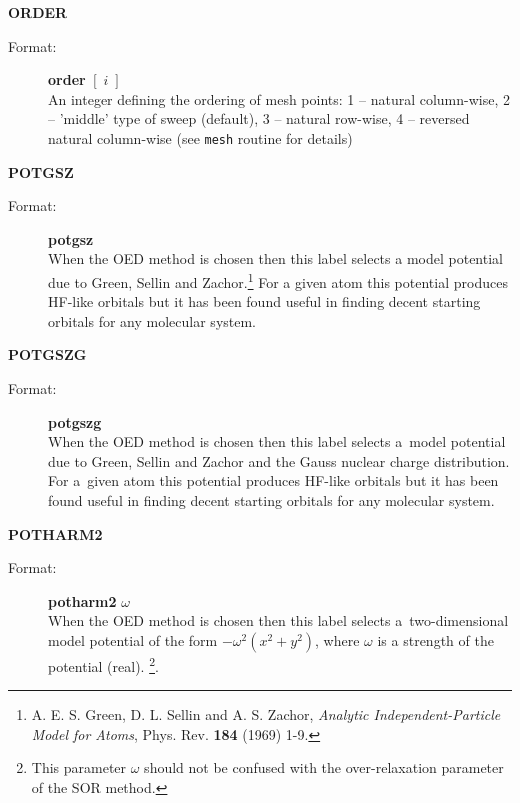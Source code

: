 \documentclass[12pt,a4paper]{article}
\newcommand{\ft}[1]{\texttt{#1}}
\begin{document}
\begin{description}
\item \textbf{ORDER}
\begin{description}
\item[Format:] \textbf{order} $[\;i\;]$\\ An integer defining the ordering of mesh points:
  1 -- natural column-wise, 2 -- 'middle' type of sweep (default), 3 -- natural
  row-wise, 4 -- reversed natural column-wise (see \ft{mesh} routine for details)
\end{description}



\item \textbf{POTGSZ}
\begin{description}
\item[Format:] \textbf{potgsz} \\ When the OED method is chosen then
  this label selects a model potential due to Green, Sellin and
  Zachor.\footnote{A. E. S. Green, D. L. Sellin and A. S. Zachor,
    \textsl{Analytic Independent-Particle Model for Atoms},
    Phys. Rev. \textbf{184} (1969) 1-9. }
  For a given atom this potential produces HF-like orbitals but it has
  been found useful in finding decent starting orbitals for any
  molecular system.
\end{description}


\item \textbf{POTGSZG}
\begin{description}
\item[Format:] \textbf{potgszg} \\ When the OED method is chosen then
  this label selects a~model potential due to Green, Sellin and Zachor
  and the Gauss nuclear charge distribution. For a~given atom this
  potential produces HF-like orbitals but it has been found useful in
  finding decent starting orbitals for any molecular system.
\end{description}


\item \textbf{POTHARM2}
\begin{description}
\item[Format:] \textbf{potharm2} $\omega$ \\ When the OED method is chosen then this
  label selects a~two-dimensional model potential of the form $-\omega^2(x^2+y^2)$, where
  $\omega$ is a strength of the potential (real).%
  \footnote{This parameter $\omega$ should not be confused with the
    over-relaxation parameter of the SOR method.}.
\end{description}



\end{description}
\end{document}
